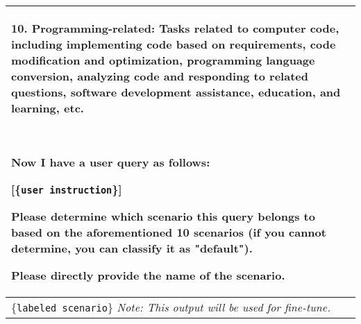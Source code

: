 \begin{table*}[tbh!]
\begin{tabularx}{\textwidth}{X}
        10. Programming-related:  Tasks related to computer code, including implementing code based on requirements, code modification and optimization, programming language conversion, analyzing code and responding to related questions, software development assistance, education, and learning, etc.
        
        \ 
        
        Now I have a user query as follows:
    
        [\{\texttt{user instruction}\}]
 
        Please determine which scenario this query belongs to based on the aforementioned 10 scenarios (if you cannot determine, you can classify it as "default").

        Please directly provide the name of the scenario.\\ \midrule
        \{\texttt{labeled scenario}\} \emph{Note: This output will be used for fine-tune.} \\ 
    \bottomrule
  \end{tabularx}
\end{table*}


